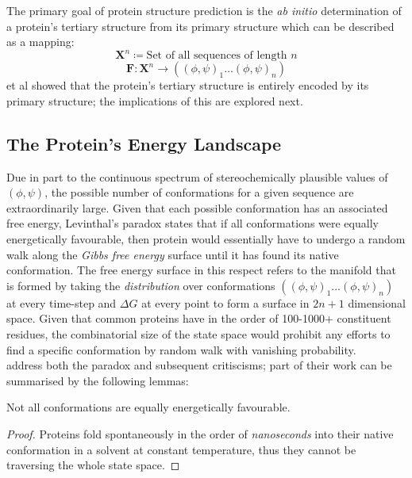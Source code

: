  The primary goal of protein structure prediction
 is the \emph{ab initio} determination of a protein's
 tertiary structure from its primary structure \cite{Yang}
 which can be described as a mapping:
 \begin{equation}
    \mathbf{X}^n \coloneqq \text{Set of all sequences of length $n$}
 \end{equation}
 \begin{equation}
    \mathbf{F}:\mathbf{X}^n \rightarrow ((\phi,\psi)_1 \ldots (\phi,\psi)_n)
 \end{equation}
 \cite{Anfinsen} et al showed that the protein's
 tertiary structure is entirely encoded by 
 its primary structure; the implications of this are explored next.

\subsection{The Protein's Energy Landscape}
Due in part to the continuous spectrum of stereochemically 
plausible values of $(\phi, \psi)$, the possible number of conformations
for a given sequence are extraordinarily large. 
Given that each possible conformation has an associated free energy,
Levinthal's paradox states that if all conformations were equally
energetically favourable, then protein would essentially have to undergo
a random walk along the \emph{Gibbs free energy} surface until it has found its native conformation.
The free energy surface in this respect refers to the manifold that is formed
by taking the \emph{distribution} over conformations $((\phi, \psi)_1\ldots(\phi,\psi)_n)$ at every time-step
and $\Delta G$ at every point to form a surface in $2n+1$ dimensional space.
Given that common proteins have in the order of 100-1000+ constituent residues,
the combinatorial size of the state space would prohibit any efforts to find 
a specific conformation by random walk with vanishing probability. \\
\cite{Yang} address both the paradox and subsequent critiscisms;
part of their work can be summarised by the following lemmas:
\begin{lemma}
    Not all conformations are equally energetically favourable.
\end{lemma}
\begin{proof}
    Proteins fold spontaneously in the order of \emph{nanoseconds} into their native
    conformation in a solvent at constant temperature, thus they cannot
    be traversing the whole state space.
\end{proof}
